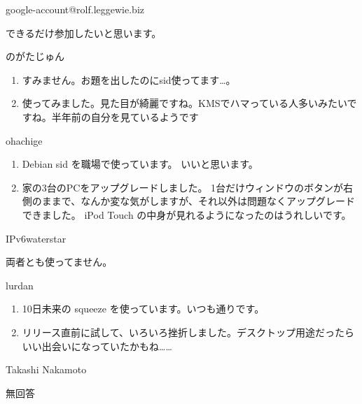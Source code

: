 \documentclass[mingoth,a4paper]{jsarticle}
\begin{document}
\begin{prework}{ google-account@rolf.leggewie.biz }

できるだけ参加したいと思います。

\end{prework}



\begin{prework}{ のがたじゅん }

    \begin{enumerate}
          \item すみません。お題を出したのにsid使ってます…。%
          \item
        使ってみました。見た目が綺麗ですね。KMSでハマっている人多いみたいですね。半年前の自分を見ているようです
    \end{enumerate}
\end{prework}

\begin{prework}{ ohachige }
    \begin{enumerate}
          \item 
        Debian sid を職場で使っています。
        いいと思います。
          \item 
        家の3台のPCをアップグレードしました。
        1台だけウィンドウのボタンが右側のままで、なんか変な気がしますが、それ以外は問題なくアップグレードできました。
        iPod Touch の中身が見れるようになったのはうれしいです。
    \end{enumerate}
\end{prework}



\begin{prework}{ IPv6waterstar }

両者とも使ってません。
\end{prework}



\begin{prework}{ lurdan }

    \begin{enumerate}
          \item 10日未来の squeeze を使っています。いつも通りです。
          \item
        リリース直前に試して、いろいろ挫折しました。デスクトップ用途だったらいい出会いになっていたかもね……
    \end{enumerate}
\end{prework}



\begin{prework}{ Takashi Nakamoto }

無回答

\end{prework}
\end{document}
